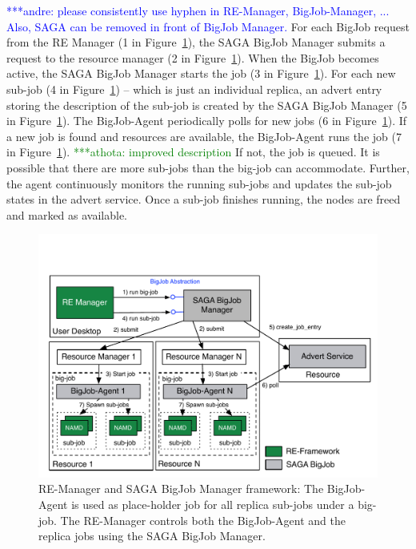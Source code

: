 \documentclass{rspublic}
\newcommand{\alnote}[1]{ {\textcolor{blue} { ***andre: #1 }}}
\newcommand{\athotanote}[1]{ {\textcolor{green} { ***athota: #1 }}}
\newcommand{\alnote}[1]{}
\newcommand{\athotanote}[1]{}
\begin{document}
\alnote{please consistently use hyphen in RE-Manager, BigJob-Manager, ... Also,
SAGA can be removed in front of BigJob Manager.}
For each BigJob request from the RE Manager (1 in Figure~\ref{fig:bigjob}), the SAGA BigJob Manager submits a request to the resource manager (2 in Figure~\ref{fig:bigjob}). When the BigJob becomes active, the SAGA BigJob Manager starts the job (3 in Figure~\ref{fig:bigjob}). For each new sub-job (4 in Figure~\ref{fig:bigjob}) -- which is just an individual replica, an advert entry storing the description of the sub-job is created by the
SAGA BigJob Manager (5 in Figure~\ref{fig:bigjob}). The BigJob-Agent periodically polls for new jobs (6 in Figure~\ref{fig:bigjob}). If a
new job is found and resources are available, the BigJob-Agent runs the job (7 in Figure~\ref{fig:bigjob}). \athotanote{improved description}
If not, the job is queued. It is possible that there are more sub-jobs 
than the big-job can accommodate. Further, the agent continuously monitors the
running sub-jobs and updates the sub-job states in the advert
service. Once a sub-job finishes running, the nodes are freed and
marked as available.
\begin{figure}[t]
      \centering
          \includegraphics[scale=0.65]{../figures/Bigjob_arch.pdf}
          \caption{\footnotesize RE-Manager and SAGA BigJob Manager
            framework: The BigJob-Agent is used as place-holder job
            for all replica sub-jobs under a big-job. The RE-Manager
            controls both the BigJob-Agent and the replica jobs using
            the SAGA BigJob Manager.  }
      \label{fig:bigjob}
\end{figure}
\end{document}
